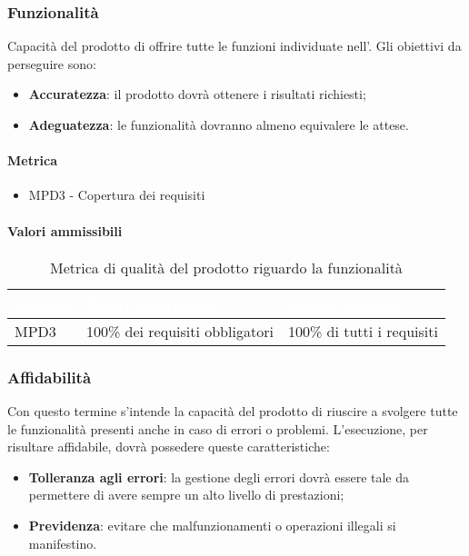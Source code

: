 \subsubsection{Funzionalità}
Capacità del prodotto di offrire tutte le funzioni individuate nell'\AdRv{}. Gli obiettivi da perseguire sono:
\begin{itemize}
\item \textbf{Accuratezza}: il prodotto dovrà ottenere i risultati richiesti;
\item \textbf{Adeguatezza}: le funzionalità dovranno almeno equivalere le attese.
\end{itemize}
\paragraph{Metrica}
\begin{itemize}
\item MPD3 - Copertura dei requisiti
\end{itemize}
\paragraph{Valori ammissibili}
\renewcommand{\arraystretch}{1.5}
\begin{longtable}{C{2.5cm} C{4cm} C{4cm}}
\textcolor{white}{\textbf{Metrica}}&
\textcolor{white}{\textbf{Valori accettabile}}&
\textcolor{white}{\textbf{Valore ottimale}}\\	
\endhead
\endfoot
{}\caption{Metrica di qualità del prodotto riguardo la funzionalità}
\endlastfoot
		MPD3 & 
		100\% dei requisiti obbligatori &
		100\% di tutti i requisiti \\
\end{longtable}
\subsubsection{Affidabilità}
Con questo termine s'intende la capacità del prodotto di riuscire a svolgere tutte le funzionalità presenti anche in caso di errori o problemi. L'esecuzione, per risultare affidabile, dovrà possedere queste caratteristiche:
\begin{itemize}
\item \textbf{Tolleranza agli errori}: la gestione degli errori dovrà essere tale da permettere di avere sempre un alto livello di prestazioni;
\item \textbf{Previdenza}: evitare che malfunzionamenti o operazioni illegali si manifestino.
\end{itemize}
